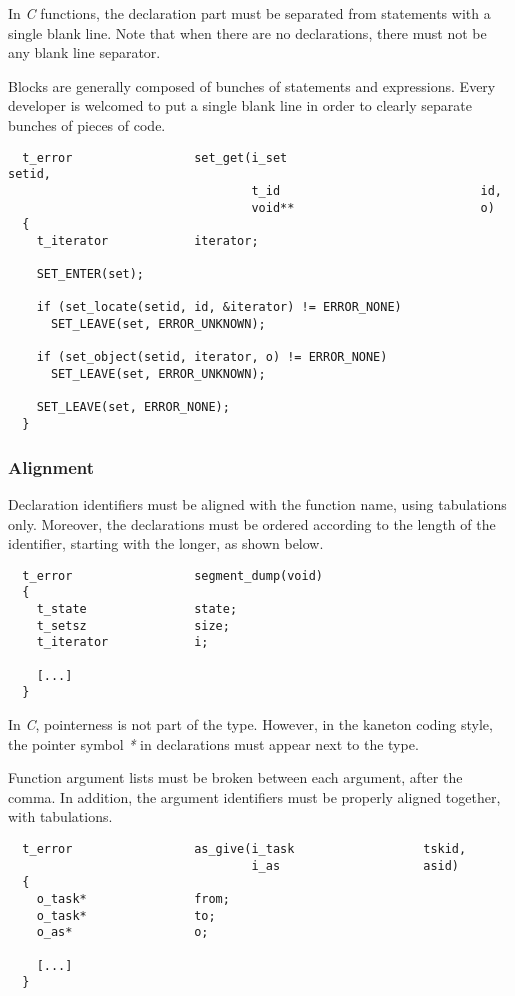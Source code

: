 In \textit{C} functions, the declaration part must be separated from statements
with a single blank line. Note that when there are no declarations, there
must not be any blank line separator.

Blocks are generally composed of bunches of statements and expressions. Every
developer is welcomed to put a single blank line in order to clearly separate
bunches of pieces of code.

\begin{verbatim}
  t_error                 set_get(i_set                           setid,
                                  t_id                            id,
                                  void**                          o)
  {
    t_iterator            iterator;

    SET_ENTER(set);

    if (set_locate(setid, id, &iterator) != ERROR_NONE)
      SET_LEAVE(set, ERROR_UNKNOWN);

    if (set_object(setid, iterator, o) != ERROR_NONE)
      SET_LEAVE(set, ERROR_UNKNOWN);

    SET_LEAVE(set, ERROR_NONE);
  }
\end{verbatim}


\subsubsection{Alignment}

Declaration identifiers must be aligned with the function name, using
tabulations only. Moreover, the declarations must be ordered according
to the length of the identifier, starting with the longer, as shown below.

\begin{verbatim}
  t_error                 segment_dump(void)
  {
    t_state               state;
    t_setsz               size;
    t_iterator            i;

    [...]
  }
\end{verbatim}

In \textit{C}, pointerness is not part of the type. However, in the kaneton
coding style, the pointer symbol \textit{*} in declarations must appear next
to the type.

Function argument lists must be broken between each argument, after the
comma. In addition, the argument identifiers must be properly aligned
together, with tabulations.

\begin{verbatim}
  t_error                 as_give(i_task                  tskid,
                                  i_as                    asid)
  {
    o_task*               from;
    o_task*               to;
    o_as*                 o;

    [...]
  }
\end{verbatim}

